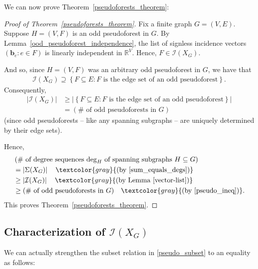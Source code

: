 \documentclass[12pt]{article}
\theoremstyle{definition}
\theoremstyle{remark}
\newcommand{\set}[1]{\left\{ #1 \right\}}
\newcommand{\abs}[1]{\left| #1 \right|}
\newcommand{\tup}[1]{\left( #1 \right)}
\begin{document}
We can now prove Theorem~\ref{pseudoforests_theorem}:

\begin{proof}[Proof of Theorem~\ref{pseudoforests_theorem}]
    Fix a finite graph $G=(V,E)$.
    Suppose $H=(V,F)$ is an odd pseudoforest in $G$. By Lemma~\ref{ood_pseudoforest_independence}, the list of signless incidence vectors $\tup{\mathbf{b}_e : e \in F}$ is linearly independent in $\mathbb{R}^V$. Hence, $F \in \mathcal{I}(X_G)$.

    And so, since $H=(V,F)$ was an arbitrary odd pseudoforest in $G$, we have that \begin{align}\label{pseudo_subset}
        \mathcal{I}(X_G)\supseteq \set{F \subseteq E : F \text{ is the edge set of an odd pseudoforest}}.
    \end{align} Consequently, \begin{align}
        \abs{\mathcal{I}(X_G)}  &\geq \abs{\set{F \subseteq E : F \text{ is the edge set of an odd pseudoforest}}} \nonumber \\
        &= (\# \text{ of odd pseudoforests in $G$})\label{pseudo_ineq}
    \end{align} (since odd pseudoforests -- like any spanning subgraphs -- are uniquely determined by their edge sets). 
    
    Hence, \begin{align*}
        &\tup{\# \text{ of degree sequences $\deg_H$ of spanning subgraphs $H \subseteq G$}} \\
        &= \abs{\Sigma(X_G)} \quad \textcolor{gray}{\text{(by \eqref{sum_equals_degs})}} \\
        &\geq \abs{\mathcal{I}(X_G)} \quad \textcolor{gray}{\text{(by Lemma~\ref{vector-list})}} \\
        &\geq (\#\text{ of odd pseudoforests in $G$}) \quad \textcolor{gray}{\text{(by \eqref{pseudo_ineq})}}.
    \end{align*} This proves Theorem~\ref{pseudoforests_theorem}.
\end{proof}

\subsection{Characterization of $\mathcal{I}(X_G)$}

We can actually strengthen the subset relation in \eqref{pseudo_subset} to an equality as follows:
\end{document}
